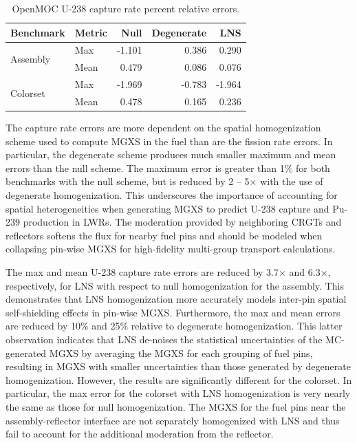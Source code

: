 \begin{table}[h!]
  \centering
  \caption{OpenMOC U-238 capture rate percent relative errors.}
  \label{tab:capt-errors} 
  \begin{tabular}{l l r r r}
  \toprule
  \textbf{Benchmark} & \textbf{Metric} & \textbf{Null} & \textbf{Degenerate} & \textbf{LNS} \\
  \midrule
  \multirow{2}{*}{Assembly} & Max  & -1.101 &  0.386 & 0.290 \\
                            & Mean &  0.479 &  0.086 & 0.076 \\
  \midrule
  \multirow{2}{*}{Colorset} & Max  & -1.969 & -0.783 & -1.964 \\
                            & Mean &  0.478 &  0.165 & 0.236 \\
  \bottomrule
\end{tabular}
\end{table}

The capture rate errors are more dependent on the spatial homogenization scheme used to compute MGXS in the fuel than are the fission rate errors. In particular, the degenerate scheme produces much smaller maximum and mean errors than the null scheme. The maximum error is greater than 1\% for both benchmarks with the null scheme, but is reduced by 2 -- 5$\times$ with the use of degenerate homogenization. This underscores the importance of accounting for spatial heterogeneities when generating MGXS to predict U-238 capture and Pu-239 production in LWRs. The moderation provided by neighboring CRGTs and reflectors softens the flux for nearby fuel pins and should be modeled when collapsing pin-wise MGXS for high-fidelity multi-group transport calculations.

The max and mean U-238 capture rate errors are reduced by 3.7$\times$ and 6.3$\times$, respectively, for LNS with respect to null homogenization for the assembly. This demonstrates that LNS homogenization more accurately models inter-pin spatial self-shielding effects in pin-wise MGXS. Furthermore, the max and mean errors are reduced by 10\% and 25\% relative to degenerate homogenization. This latter observation indicates that LNS de-noises the statistical uncertainties of the MC-generated MGXS by averaging the MGXS for each grouping of fuel pins, resulting in MGXS with smaller uncertainties than those generated by degenerate homogenization. However, the results are significantly different for the colorset. In particular, the max error for the colorset with LNS homogenization is very nearly the same as those for null homogenization. The MGXS for the fuel pins near the assembly-reflector interface are not separately homogenized with LNS and thus fail to account for the additional moderation from the reflector.

